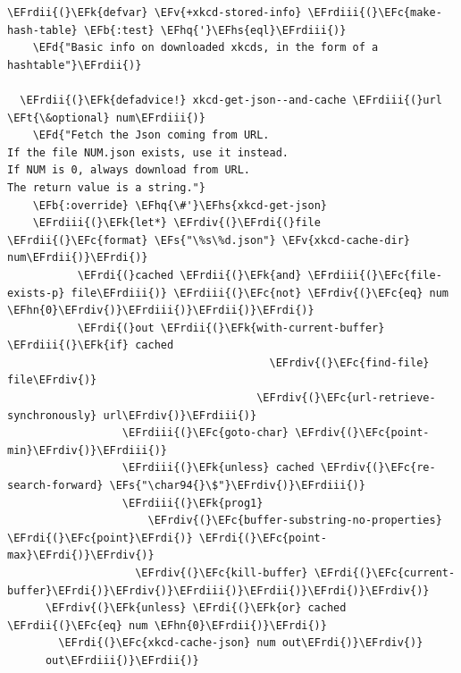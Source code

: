 \documentclass{scrartcl}
\newcommand{\EFk}[1]{\textcolor{EFk}{#1}} %
\newcommand{\EFd}[1]{\textcolor{EFd}{\textit{#1}}} %
\newcommand{\EFt}[1]{\textcolor{EFt}{#1}} %
\newcommand{\EFs}[1]{\textcolor{EFs}{#1}} %
\newcommand{\EFb}[1]{\textcolor{EFb}{#1}} %
\newcommand{\EFc}[1]{\textcolor{EFc}{#1}} %
\newcommand{\EFv}[1]{\textcolor{EFv}{#1}} %
\newcommand{\EFhn}[1]{\textcolor{EFhn}{\textbf{#1}}} %
\newcommand{\EFhq}[1]{\textcolor{EFhq}{#1}} %
\newcommand{\EFhs}[1]{\textcolor{EFhs}{#1}} %
\newcommand{\EFrdi}[1]{\textcolor{EFrdi}{#1}} %
\newcommand{\EFrdii}[1]{\textcolor{EFrdii}{#1}} %
\newcommand{\EFrdiii}[1]{\textcolor{EFrdiii}{#1}} %
\newcommand{\EFrdiv}[1]{\textcolor{EFrdiv}{#1}} %
\begin{document}
\begin{Code}
\begin{Verbatim}[]
  \EFrdii{(}\EFk{defvar} \EFv{+xkcd-stored-info} \EFrdiii{(}\EFc{make-hash-table} \EFb{:test} \EFhq{'}\EFhs{eql}\EFrdiii{)}
    \EFd{"Basic info on downloaded xkcds, in the form of a hashtable"}\EFrdii{)}

  \EFrdii{(}\EFk{defadvice!} xkcd-get-json--and-cache \EFrdiii{(}url \EFt{\&optional} num\EFrdiii{)}
    \EFd{"Fetch the Json coming from URL.
If the file NUM.json exists, use it instead.
If NUM is 0, always download from URL.
The return value is a string."}
    \EFb{:override} \EFhq{\#'}\EFhs{xkcd-get-json}
    \EFrdiii{(}\EFk{let*} \EFrdiv{(}\EFrdi{(}file \EFrdii{(}\EFc{format} \EFs{"\%s\%d.json"} \EFv{xkcd-cache-dir} num\EFrdii{)}\EFrdi{)}
           \EFrdi{(}cached \EFrdii{(}\EFk{and} \EFrdiii{(}\EFc{file-exists-p} file\EFrdiii{)} \EFrdiii{(}\EFc{not} \EFrdiv{(}\EFc{eq} num \EFhn{0}\EFrdiv{)}\EFrdiii{)}\EFrdii{)}\EFrdi{)}
           \EFrdi{(}out \EFrdii{(}\EFk{with-current-buffer} \EFrdiii{(}\EFk{if} cached
                                         \EFrdiv{(}\EFc{find-file} file\EFrdiv{)}
                                       \EFrdiv{(}\EFc{url-retrieve-synchronously} url\EFrdiv{)}\EFrdiii{)}
                  \EFrdiii{(}\EFc{goto-char} \EFrdiv{(}\EFc{point-min}\EFrdiv{)}\EFrdiii{)}
                  \EFrdiii{(}\EFk{unless} cached \EFrdiv{(}\EFc{re-search-forward} \EFs{"\char94{}\$"}\EFrdiv{)}\EFrdiii{)}
                  \EFrdiii{(}\EFk{prog1}
                      \EFrdiv{(}\EFc{buffer-substring-no-properties} \EFrdi{(}\EFc{point}\EFrdi{)} \EFrdi{(}\EFc{point-max}\EFrdi{)}\EFrdiv{)}
                    \EFrdiv{(}\EFc{kill-buffer} \EFrdi{(}\EFc{current-buffer}\EFrdi{)}\EFrdiv{)}\EFrdiii{)}\EFrdii{)}\EFrdi{)}\EFrdiv{)}
      \EFrdiv{(}\EFk{unless} \EFrdi{(}\EFk{or} cached \EFrdii{(}\EFc{eq} num \EFhn{0}\EFrdii{)}\EFrdi{)}
        \EFrdi{(}\EFc{xkcd-cache-json} num out\EFrdi{)}\EFrdiv{)}
      out\EFrdiii{)}\EFrdii{)}


\end{Verbatim}
\end{Code}
\end{document}
